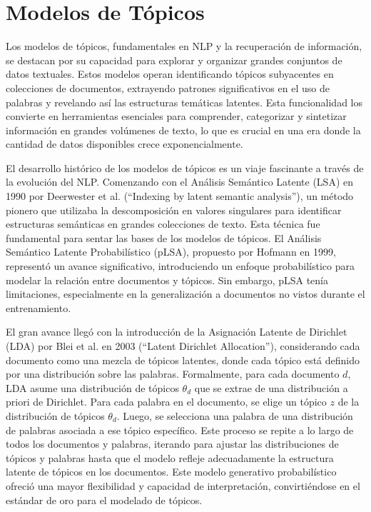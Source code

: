 \section{Modelos de T\'opicos}

Los modelos de tópicos, fundamentales en NLP y la recuperación de información, se destacan por su capacidad para explorar y organizar grandes conjuntos de datos textuales. Estos modelos operan identificando tópicos subyacentes en colecciones de documentos, extrayendo patrones significativos en el uso de palabras y revelando así las estructuras temáticas latentes. Esta funcionalidad los convierte en herramientas esenciales para comprender, categorizar y sintetizar información en grandes volúmenes de texto, lo que es crucial en una era donde la cantidad de datos disponibles crece exponencialmente.

El desarrollo histórico de los modelos de tópicos es un viaje fascinante a través de la evolución del NLP. Comenzando con el Análisis Semántico Latente (LSA) en 1990 por Deerwester et al. (``Indexing by latent semantic analysis''), un método pionero que utilizaba la descomposición en valores singulares para identificar estructuras semánticas en grandes colecciones de texto. Esta técnica fue fundamental para sentar las bases de los modelos de tópicos.
El Análisis Semántico Latente Probabilístico (pLSA), propuesto por Hofmann en 1999, representó un avance significativo, introduciendo un enfoque probabilístico para modelar la relación entre documentos y tópicos. Sin embargo, pLSA tenía limitaciones, especialmente en la generalización a documentos no vistos durante el entrenamiento.

El gran avance llegó con la introducción de la Asignación Latente de Dirichlet (LDA) por Blei et al. en 2003 (``Latent Dirichlet Allocation''), considerando cada documento como una mezcla de tópicos latentes, donde cada tópico está definido por una distribución sobre las palabras. Formalmente,
para cada documento \( d \), LDA asume una distribución de tópicos \( \theta_d \) que se extrae de una distribución a priori de Dirichlet. Para cada palabra en el documento, se elige un tópico \( z \) de la distribución de tópicos \( \theta_d \). Luego, se selecciona una palabra de una distribución de palabras asociada a ese tópico específico.
Este proceso se repite a lo largo de todos los documentos y palabras, iterando para ajustar las distribuciones de tópicos y palabras hasta que el modelo refleje adecuadamente la estructura latente de tópicos en los documentos. Este modelo generativo probabilístico ofreció una mayor flexibilidad y capacidad de interpretación, convirtiéndose en el estándar de oro para el modelado de tópicos.

